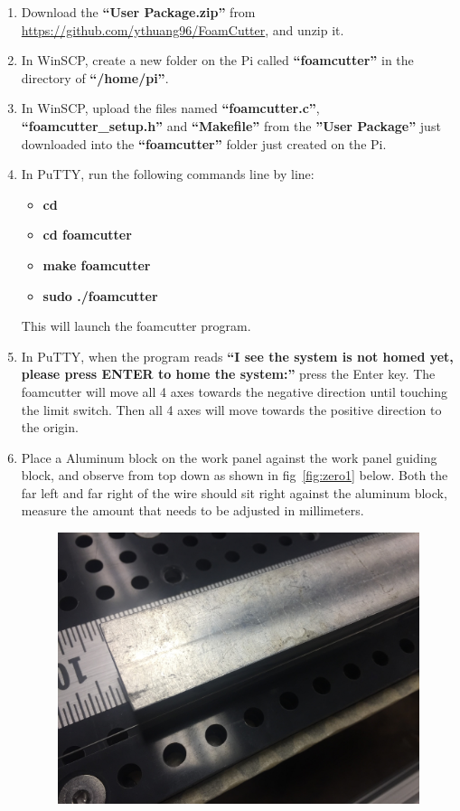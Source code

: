 \documentclass[titlepage,12pt,letter]{report}
\numberwithin{equation}{chapter}
\begin{document}
\begin{enumerate}[itemsep = 5pt,topsep=0pt]
\item Download the \textbf{``User Package.zip''} from \href{https://github.com/ythuang96/FoamCutter}{https://github.com/ythuang96/FoamCutter}, and unzip it.
\item In WinSCP, create a new folder on the Pi called \textbf{``foamcutter''} in the directory of \textbf{``/home/pi''}. 
\item In WinSCP, upload the files named \textbf{``foamcutter.c''}, \textbf{``foamcutter\_setup.h''} and \textbf{``Makefile''} from the \textbf{''User Package''} just downloaded into the \textbf{``foamcutter''} folder just created on the Pi.
\item In PuTTY, run the following commands line by line:
\begin{itemize}[noitemsep,topsep=0pt]
	\item \textbf{cd}
	\item \textbf{cd foamcutter}
	\item \textbf{make foamcutter}
	\item \textbf{sudo ./foamcutter}
\end{itemize}
This will launch the foamcutter program.
\item In PuTTY, when the program reads \textbf{``I see the system is not homed yet, please press ENTER to home the system:''} press the Enter key. The foamcutter will move all 4 axes towards the negative direction until touching the limit switch. Then all 4 axes will move towards the positive direction to the origin.
\item Place a Aluminum block on the work panel against the work panel guiding block, and observe from top down as shown in fig~\ref{fig:zero1} below. Both the far left and far right of the wire should sit right against the aluminum block, measure the amount that needs to be adjusted in millimeters. 
\begin{figure} [H]
\includegraphics[width = 0.8\linewidth]{./Figures/zero_wire_1.jpg}

\end{figure}
\end{enumerate}
\end{document}
